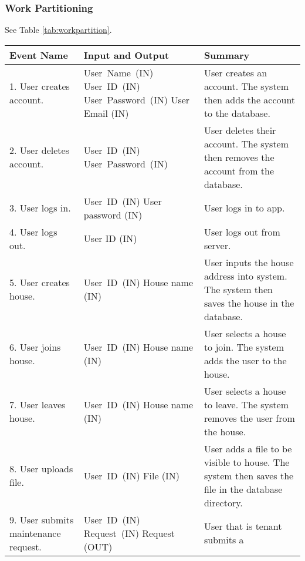 \documentclass[12pt]{article}
\begin{document}
\subsubsection{Work Partitioning} 
See Table \ref{tab:workpartition}.
\begin{longtable}{|p{5cm}|p{5cm}|p{5cm}|}
\hline
\textbf{Event Name}  & \textbf{Input and Output} & \textbf{Summary} \\ 
\hline
1. User creates account. & \mbox{User Name (IN)} \linebreak \mbox{User ID (IN)} 
\linebreak \mbox{User Password (IN)} \linebreak User Email (IN) & User creates 
an account. The system then adds the account to the database. \\ 
\hline
2. User deletes account. & \mbox{User ID (IN)} \linebreak \mbox{User Password 
(IN)} & User deletes their account. The system then removes the account from the 
database. \\ 
\hline
3. User logs in. & \mbox{User ID (IN)} \linebreak User password (IN) & User logs 
in to app. \\ 
\hline
4. User logs out. & User ID (IN) & User logs out from server. \\
\hline
5. User creates house. & \mbox{User ID (IN)} \linebreak House name (IN) & User 
inputs the house address into system. The system then saves the house in the 
database. \\
\hline
6. User joins house. & \mbox{User ID (IN)} \linebreak House name (IN) & User 
selects a house to join. The system adds the user to the house. \\
\hline
7. User leaves house. & \mbox{User ID (IN)} \linebreak House name (IN) & User 
selects a house to leave. The system removes the user from the house. \\
\hline
8. User uploads file. & \mbox{User ID (IN)} \linebreak File (IN) & User adds a 
file to be visible to house. The system then saves the file in the database 
directory. \\
\hline
9. User submits maintenance request. & \mbox{User ID (IN)} \linebreak 
\mbox{Request (IN)} \linebreak Request (OUT) & User that is tenant submits a 

\end{longtable}
\end{document}
